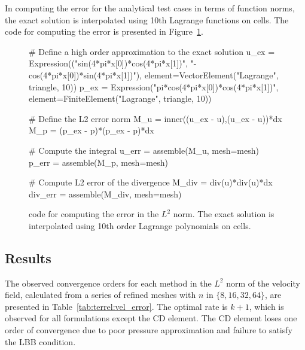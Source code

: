 In computing the error for the analytical test cases in terms of function
norms, the exact solution is interpolated using 10th Lagrange
functions on cells. The code for computing the error is presented in
Figure~\ref{code:terrel:error}.

\begin{figure}
\begin{python}
# Define a high order approximation to the exact solution
u_ex = Expression(("sin(4*pi*x[0])*cos(4*pi*x[1])",
               "-cos(4*pi*x[0])*sin(4*pi*x[1])"),
               element=VectorElement("Lagrange", triangle, 10))
p_ex = Expression("pi*cos(4*pi*x[0])*cos(4*pi*x[1])",
               element=FiniteElement("Lagrange", triangle, 10))

# Define the L2 error norm
M_u = inner((u_ex - u),(u_ex - u))*dx
M_p = (p_ex - p)*(p_ex - p)*dx

# Compute the integral
u_err = assemble(M_u, mesh=mesh)
p_err = assemble(M_p, mesh=mesh)

# Compute L2 error of the divergence
M_div = div(u)*div(u)*dx
div_err = assemble(M_div, mesh=mesh)
\end{python}
\label{code:terrel:error}
\caption{\dolfin{} code for computing the error in the $L^{2}$ norm. The
exact solution is interpolated using 10th order Lagrange polynomials
on cells.}
\end{figure}
\subsection{Results}

The observed convergence orders for each method in the $L^{2}$
norm of the velocity field, calculated from a series of
refined meshes with $n$ in $\{8, 16, 32, 64\}$, are presented in
Table~\ref{tab:terrel:vel_error}. The optimal rate is $k + 1$, which is
observed for all formulations except the CD element.  The CD element
loses one order of convergence due to poor pressure approximation and
failure to satisfy the LBB condition.

